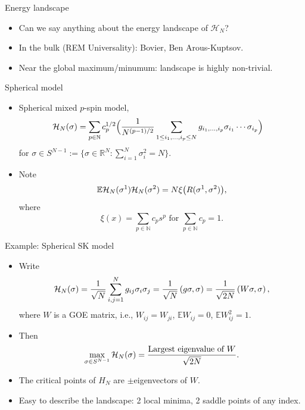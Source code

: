 \documentclass[handout]{beamer}
\def\H{{\cal H}}
\newcommand{\e}{\mathbb{E}}
\begin{document}
%     
\begin{frame}{Energy landscape}
	\begin{itemize}

		\item Can we say anything about the energy landscape of $\mathcal H_N$?

		\item In the bulk (REM Universality): Bovier, Ben Arous-Kuptsov.   
		
		\item Near the global maximum/minumum: landscape is highly non-trivial.
		
	
    \end{itemize}
\end{frame}
 



\begin{frame}{Spherical model}
	
	 \begin{itemize}
	 	\item {\color{red}Spherical} mixed $p$-spin model, 
	 	\begin{align*}
	 	\H_N(\sigma)&=\sum_{p\in \mathbb{N}}c_p^{1/2}\Bigl(\frac{1}{N^{(p-1)/2}}\sum_{1\leq i_1,\ldots,i_p\leq N}g_{i_1,\ldots,i_p}\sigma_{i_1}\cdots\sigma_{i_p}\Bigr)
	 	\end{align*}
	 	for $\sigma\in S^{N-1}:=\{\sigma\in\mathbb{R}^N:\sum_{i=1}^N\sigma_i^2=N\}.$
	 	\pause
	 	
	 	\item
	 	Note
	 	$$
	 	\e \H_N(\sigma^1)\H_N(\sigma^2)=N\xi\bigl(R(\sigma^1,\sigma^2)\bigr),
	 	$$
	 	where $$\xi(x)=\sum_{p\in \mathbb{N}}c_ps^p\,\,\mbox{for}\,\,\sum_{p\in \mathbb{N}}c_p=1.$$ 
	  
	 \end{itemize}
\end{frame}

\begin{frame}{Example: Spherical SK model}
	\begin{itemize}
		\item Write
	\begin{align*}
	\H_N(\sigma)=\frac{1}{\sqrt{N}}\sum_{i,j=1}^Ng_{ij}\sigma_i\sigma_j=\frac{1}{\sqrt{N}}\left(g\sigma,\sigma\right)=\frac{1}{\sqrt{2N}}\left(W\sigma,\sigma\right),
	\end{align*}
	where $W$ is a GOE matrix, i.e., $W_{ij}=W_{ji}$, $\e W_{ij}=0$, $\e W_{ij}^2=1.$
	
	\pause
	
	\item Then $$\max_{\sigma\in S^{N-1}}\H_N(\sigma)=\frac{\mbox{Largest eigenvalue of $W$}}{\sqrt{2N}}.$$
	\item The critical points of $H_N$ are $\pm$eigenvectors of $W.$
	
	\item Easy to describe the landscape: 2 local minima, 2 saddle points of any index.  
	
\end{itemize}

\end{frame}
\end{document}
